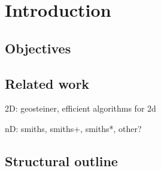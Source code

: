 {
\abnormalparskip{0pt}
\chapter{Introduction}
\label{cha:introduction}
}


\section{Objectives}
\label{sec:objectives}


\section{Related work}
\label{sec:related-work}

2D: geosteiner, efficient algorithms for 2d

nD: smiths, smiths+, smiths*, other?


\section{Structural outline}
\label{sec:structural-outline}


\chapterbreak{}

